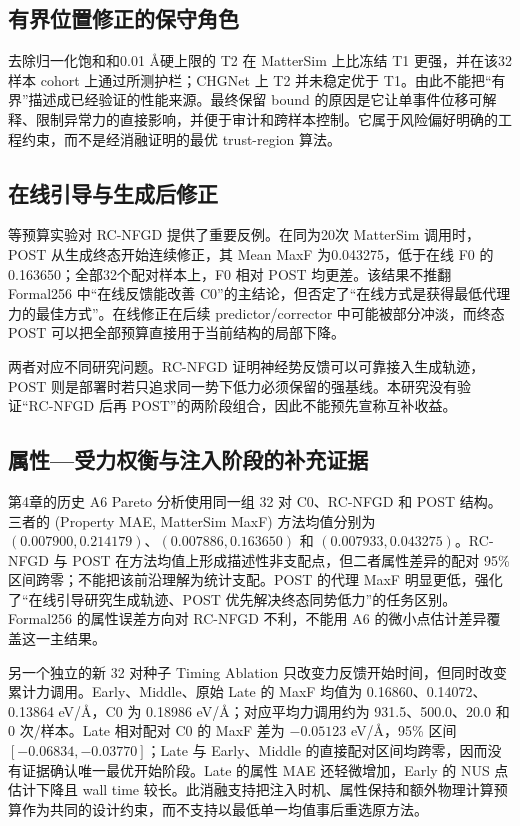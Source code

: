 \subsection{有界位置修正的保守角色}

去除归一化饱和和0.01 Å硬上限的 T2 在 Matter\allowbreak Sim 上比冻结 T1 更强，并在该32样本 cohort 上通过所测护栏；CHGNet 上 T2 并未稳定优于 T1。由此不能把``有界''描述成已经验证的性能来源。最终保留 bound 的原因是它让单事件位移可解释、限制异常力的直接影响，并便于审计和跨样本控制。它属于风险偏好明确的工程约束，而不是经消融证明的最优 trust-region 算法。

\subsection{在线引导与生成后修正}

等预算实验对 RC-NFGD 提供了重要反例。在同为20次 Matter\allowbreak Sim 调用时，POST 从生成终态开始连续修正，其 Mean MaxF 为0.043275，低于在线 F0 的0.163650；全部32个配对样本上，F0 相对 POST 均更差。该结果不推翻 Formal256 中``在线反馈能改善 C0''的主结论，但否定了``在线方式是获得最低代理力的最佳方式''。在线修正在后续 predictor/corrector 中可能被部分冲淡，而终态 POST 可以把全部预算直接用于当前结构的局部下降。

两者对应不同研究问题。RC-NFGD 证明神经势反馈可以可靠接入生成轨迹，POST 则是部署时若只追求同一势下低力必须保留的强基线。本研究没有验证``RC-NFGD 后再 POST''的两阶段组合，因此不能预先宣称互补收益。

\subsection{属性---受力权衡与注入阶段的补充证据}

第4章的历史 A6 Pareto 分析使用同一组 32 对 C0、RC-NFGD 和 POST 结构。三者的 (Property MAE, Matter\allowbreak Sim MaxF) 方法均值分别为 $(0.007900,0.214179)$、$(0.007886,0.163650)$ 和 $(0.007933,0.043275)$。RC-NFGD 与 POST 在方法均值上形成描述性非支配点，但二者属性差异的配对 95\% 区间跨零；不能把该前沿理解为统计支配。POST 的代理 MaxF 明显更低，强化了“在线引导研究生成轨迹、POST 优先解决终态同势低力”的任务区别。Formal256 的属性误差方向对 RC-NFGD 不利，不能用 A6 的微小点估计差异覆盖这一主结果。

另一个独立的新 32 对种子 Timing Ablation 只改变力反馈开始时间，但同时改变累计力调用。Early、Middle、原始 Late 的 MaxF 均值为 0.16860、0.14072、0.13864 eV/\AA，C0 为 0.18986 eV/\AA；对应平均力调用约为 931.5、500.0、20.0 和 0 次/样本。Late 相对配对 C0 的 MaxF 差为 $-0.05123$ eV/\AA，95\% 区间 $[-0.06834,-0.03770]$；Late 与 Early、Middle 的直接配对区间均跨零，因而没有证据确认唯一最优开始阶段。Late 的属性 MAE 还轻微增加，Early 的 NUS 点估计下降且 wall time 较长。此消融支持把注入时机、属性保持和额外物理计算预算作为共同的设计约束，而不支持以最低单一均值事后重选原方法。


